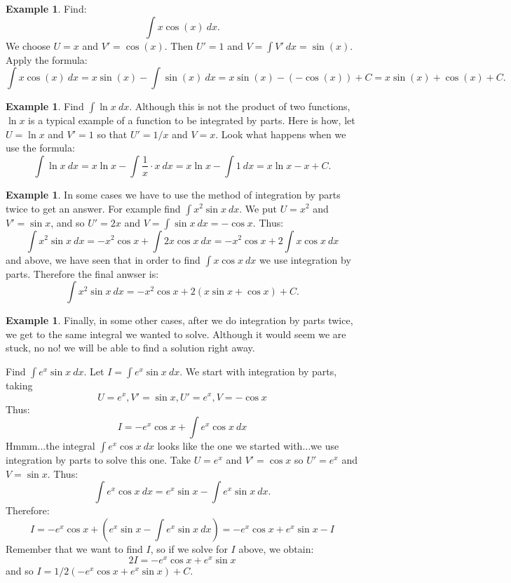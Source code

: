 \documentclass[12pt]{article}
\theoremstyle{definition}
\newtheorem{exa}[thm]{Example}
\begin{document}
\begin{exa}
Find: $$\int x\cos (x) \ dx .$$
We choose $U=x$ and $V'=\cos(x)$. Then $U'=1$ and $V=\int V' \ dx= \sin(x)$. Apply the formula:
$$\int x\cos(x) \ dx = x \sin (x) - \int \sin (x) \ dx= x\sin(x) - (-\cos (x)) +C = x\sin (x) + \cos (x) + C.$$
\end{exa}

\begin{exa}
Find $\int \ln x \ dx$. Although this is not the product of two functions, $\ln x$ is a typical example of a function to be
integrated by parts. Here is how, let $U=\ln x$ and $V'=1$ so that $U'=1/x$ and $V=x$. Look what happens when we use the formula:
$$\int \ln x \ dx = x\ln x - \int \frac{1}{x}\cdot x \ dx = x\ln x - \int 1 \ dx = x\ln x - x + C.$$
\end{exa}

\eject
\begin{exa}
In some cases we have to use the method of integration by parts twice to get an answer. For example find $\int x^2 \sin x \ dx$.
We put $U=x^2$ and $V'=\sin x$, and so $U'=2x$ and $V=\int \sin x \ dx=-\cos x$. Thus:
$$\int x^2 \sin x \ dx = -x^2 \cos x +\int 2x \cos x \ dx = -x^2 \cos x + 2\int x \cos x \ dx$$
and above, we have seen that in order to find $\int x \cos x \ dx$ we use integration by parts. Therefore the final anwser is:
$$\int x^2 \sin x \ dx = -x^2 \cos x + 2(x \sin x + \cos x) + C.$$
\end{exa}

\begin{exa}
Finally, in some other cases, after we do integration by parts twice, we get to the same integral we wanted to solve.
Although it would seem we are stuck, no no! we will be able to find a solution right away.

Find $\int e^x \sin x \ dx$. Let $I=\int e^x \sin x \ dx$. We start with integration by parts, taking
$$U=e^x, V'=\sin x, U'=e^x, V=-\cos x$$
Thus:
$$I=-e^x\cos x + \int e^x \cos x \ dx $$
Hmmm...the integral $\int e^x \cos x \ dx$ looks like the one we started with...we use integration by parts to solve this one.
Take $U=e^x$ and $V'=\cos x $ so $U'=e^x$ and $V=\sin x$. Thus:
$$\int e^x \cos x \ dx = e^x \sin x - \int e^x \sin x \ dx. $$
Therefore:
$$I=-e^x \cos x + ( e^x \sin x - \int e^x \sin x \ dx )= -e^x \cos x + e^x \sin x  - I$$
Remember that we want to find $I$, so if we solve for $I$ above, we obtain:
$$2I=-e^x \cos x + e^x \sin x$$
and so $I=1/2 ( -e^x \cos x + e^x \sin x) + C$.
\end{exa}
\end{document}
